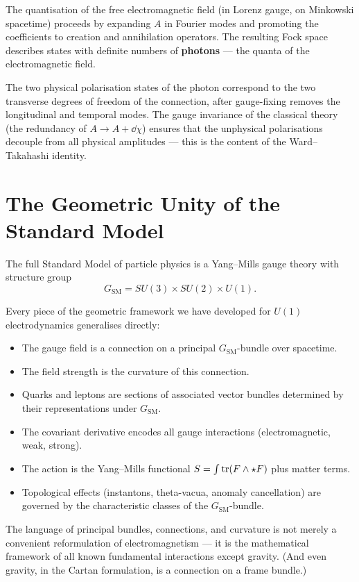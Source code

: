The quantisation of the free electromagnetic field (in Lorenz gauge, on Minkowski spacetime) proceeds by expanding $A$ in Fourier modes and promoting the coefficients to creation and annihilation operators. The resulting Fock space describes states with definite numbers of \textbf{photons} --- the quanta of the electromagnetic field.

The two physical polarisation states of the photon correspond to the two transverse degrees of freedom of the connection, after gauge-fixing removes the longitudinal and temporal modes. The gauge invariance of the classical theory (the redundancy of $A \to A + \dd\chi$) ensures that the unphysical polarisations decouple from all physical amplitudes --- this is the content of the Ward--Takahashi identity.

\section{The Geometric Unity of the Standard Model}

The full Standard Model of particle physics is a Yang--Mills gauge theory with structure group
\begin{equation}
G_{\text{SM}} = SU(3) \times SU(2) \times U(1).
\end{equation}

Every piece of the geometric framework we have developed for $U(1)$ electrodynamics generalises directly:

\begin{itemize}
\item The gauge field is a connection on a principal $G_{\text{SM}}$-bundle over spacetime.
\item The field strength is the curvature of this connection.
\item Quarks and leptons are sections of associated vector bundles determined by their representations under $G_{\text{SM}}$.
\item The covariant derivative encodes all gauge interactions (electromagnetic, weak, strong).
\item The action is the Yang--Mills functional $S = \int \operatorname{tr}(F \wedge \star F)$ plus matter terms.
\item Topological effects (instantons, theta-vacua, anomaly cancellation) are governed by the characteristic classes of the $G_{\text{SM}}$-bundle.
\end{itemize}

The language of principal bundles, connections, and curvature is not merely a convenient reformulation of electromagnetism --- it is the mathematical framework of all known fundamental interactions except gravity. (And even gravity, in the Cartan formulation, is a connection on a frame bundle.)

